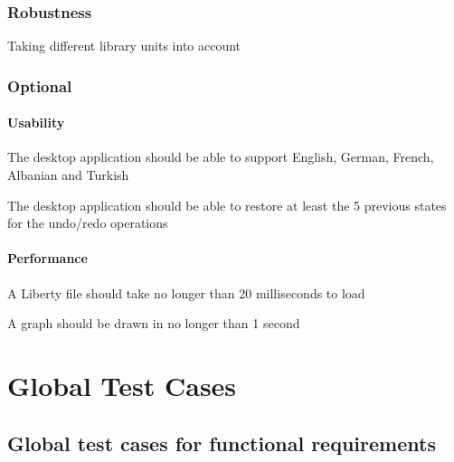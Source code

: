\documentclass[10pt,a4paper]{report}
\begin{document}
\subsection{Robustness}
\begin{NFR-Rob}
    \item Taking different library units into account
\end{NFR-Rob}

\subsection{Optional}
\subsubsection{Usability}
\begin{NFRO-Usability}
    \item The desktop application should be able to support English, German, French, Albanian and Turkish
    \item The desktop application should be able to restore at least the 5 previous states for the undo/redo operations 
\end{NFRO-Usability}

\subsubsection{Performance}
\begin{NFRO-Perf}
    \item A Liberty file should take no longer than 20 milliseconds to load
    \item A graph should be drawn in no longer than 1 second
\end{NFRO-Perf}

\chapter{Global Test Cases}

\section{Global test cases for functional requirements}
\end{document}
